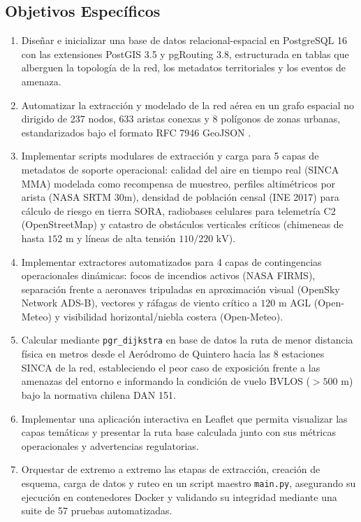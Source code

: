 \documentclass[letterpaper,12pt]{article}
\begin{document}
\subsection{Objetivos Específicos}

\begin{enumerate}
    \item Diseñar e inicializar una base de datos relacional-espacial en PostgreSQL 16 con las extensiones PostGIS 3.5 y pgRouting 3.8, estructurada en tablas que alberguen la topología de la red, los metadatos territoriales y los eventos de amenaza.
    \item Automatizar la extracción y modelado de la red aérea en un grafo espacial no dirigido de 237 nodos, 633 aristas conexas y 8 polígonos de zonas urbanas, estandarizados bajo el formato RFC 7946 GeoJSON \cite{rfc7946}.
    \item Implementar scripts modulares de extracción y carga para 5 capas de metadatos de soporte operacional: calidad del aire en tiempo real (SINCA MMA) modelada como recompensa de muestreo, perfiles altimétricos por arista (NASA SRTM 30m), densidad de población censal (INE 2017) para cálculo de riesgo en tierra SORA, radiobases celulares para telemetría C2 (OpenStreetMap) y catastro de obstáculos verticales críticos (chimeneas de hasta $152\text{ m}$ y líneas de alta tensión $110/220\text{ kV}$).
    \item Implementar extractores automatizados para 4 capas de contingencias operacionales dinámicas: focos de incendios activos (NASA FIRMS), separación frente a aeronaves tripuladas en aproximación visual (OpenSky Network ADS-B), vectores y ráfagas de viento crítico a $120\text{ m}$ AGL (Open-Meteo) y visibilidad horizontal/niebla costera (Open-Meteo).
    \item Calcular mediante \texttt{pgr\_dijkstra} en base de datos la ruta de menor distancia física en metros desde el Aeródromo de Quintero hacia las 8 estaciones SINCA de la red, estableciendo el peor caso de exposición frente a las amenazas del entorno e informando la condición de vuelo BVLOS ($>500\text{ m}$) bajo la normativa chilena DAN 151.
    \item Implementar una aplicación interactiva en Leaflet que permita visualizar las capas temáticas y presentar la ruta base calculada junto con sus métricas operacionales y advertencias regulatorias.
    \item Orquestar de extremo a extremo las etapas de extracción, creación de esquema, carga de datos y ruteo en un script maestro \texttt{main.py}, asegurando su ejecución en contenedores Docker y validando su integridad mediante una suite de 57 pruebas automatizadas.
\end{enumerate}
\end{document}
